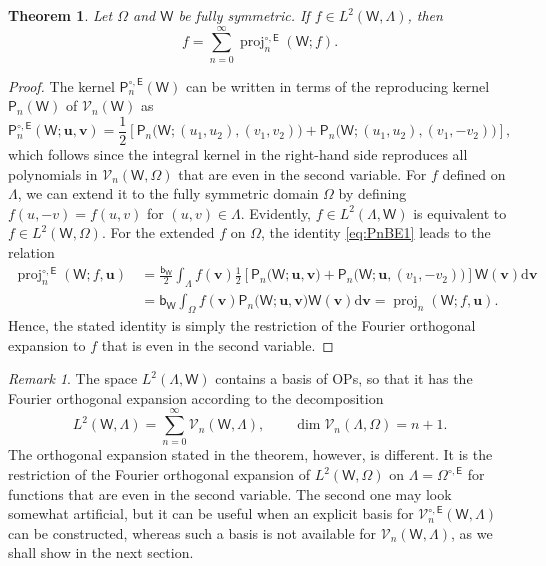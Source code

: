 \documentclass{amsart}
\newtheorem{thm}{Theorem}[section]
\theoremstyle{remark}
\newtheorem{rem}{Remark}[section]\newtheorem*{notation}{Notation}
\def\d{\mathrm{d}}
\def\sb{{\mathsf b}}
\def\sE{{\mathsf E}}
\def\sP{{\mathsf P}}
\def\sW{{\mathsf W}}
\def\ub{{\mathbf u}}
\def\vb{{\mathbf v}}
\def\CV{{\mathcal V}}
\def\proj{\operatorname{proj}}
\def\f{\frac}
\begin{document}
\begin{thm} \label{thm:Fourier}
Let $\Omega$ and $\sW$ be fully symmetric. If $f \in L^2(\sW, \Lambda)$, then 
\begin{equation}\label{eq:Fourier}
       f = \sum_{n=0}^\infty  \proj_n^{\circ, \sE}(\sW; f). 
\end{equation}
\end{thm}

\begin{proof}
The kernel $\sP_n^{\circ, \sE}(\sW)$ can be written in terms of the reproducing kernel $\sP_n(\sW)$ of $\CV_n(\sW)$ as 
\begin{equation}\label{eq:PnBE1}
   \sP_n^{\circ, \sE}(\sW; \ub,\vb) = \frac12 \left[ \sP_n \big (\sW; (u_1,u_2), (v_1,v_2)\big) 
                + \sP_n \big(\sW; (u_1,u_2), (v_1, - v_2)\big) \right],
\end{equation}
which follows since the integral kernel in the right-hand side reproduces all polynomials in $\CV_n(\sW,\Omega)$ that 
are even in the second variable. For $f$ defined on $\Lambda$, we can extend it to the fully symmetric domain 
$\Omega$ by defining $f(u,-v) = f(u,v)$ for $(u,v) \in \Lambda$. Evidently, $f\in L^2(\Lambda, \sW)$ is equivalent to 
$f\in L^2(\sW,\Omega)$. For the extended $f$ on $\Omega$, the identity \eqref{eq:PnBE1} leads to the relation
\begin{align*}
   \proj_n^{\circ, \sE}(\sW; f, \ub) \, & = \f{\sb_\sW}{2} \int_\Lambda f(\vb)  \frac12 \left[ \sP_n \big (\sW; \ub, \vb\big) 
                + \sP_n \big(\sW; \ub, (v_1, - v_2)\big) \right] \sW(\vb) \d \vb  \\
           &  = \sb_\sW \int_\Omega f(\vb) \sP_n \big (\sW; \ub, \vb\big) \sW(\vb) \d \vb = \proj_n (\sW; f,\ub). 
\end{align*}
Hence, the stated identity is simply the restriction of the Fourier orthogonal expansion to $f$ that is even
in the second variable. 
\end{proof}

\begin{rem}
The space $L^2(\Lambda, \sW)$ contains a basis of OPs, so that it has the Fourier orthogonal expansion according to 
the decomposition 
$$
L^2(\sW,\Lambda) = \sum_{n=0}^\infty \CV_n(\sW,\Lambda), \qquad \dim \CV_n(\Lambda, \Omega) = n+1. 
$$
The orthogonal expansion stated in the theorem, however, is different. It is the restriction of the Fourier orthogonal 
expansion of $L^2(\sW,\Omega)$ on $\Lambda = \Omega^{\circ, \sE}$ for functions that are even in the second 
variable. The second one may look somewhat artificial, but it can be useful when an explicit basis for
$\CV_n^{\circ,\sE}(\sW,\Lambda)$ can be constructed, whereas such a basis is not available for $\CV_n(\sW,\Lambda)$, 
as we shall show in the next section. 
\end{rem}
\end{document}
